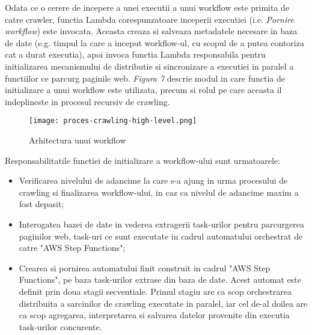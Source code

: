 Odata ce o cerere de incepere a unei executii a unui workflow este primita de catre crawler, functia Lambda corespunzatoare inceperii executiei (i.e. \textit{Pornire workflow}) este invocata. Aceasta creaza si salveaza metadatele necesare in baza de date (e.g. timpul la care a inceput workflow-ul, cu scopul de a putea contoriza cat a durat executia), apoi invoca functia Lambda responsabila pentru initializarea mecanismului de distributie si sincronizare a executiei in paralel a functiilor ce parcurg paginile web. \textit{Figura 7} descrie modul in care functia de initializare a unui workflow este utilizata, precum si rolul pe care aceasta il indeplineste in procesul recursiv de crawling.

\begin{figure}[ht]
\begin{center}
	\texttt{[image: proces-crawling-high-level.png]}
	\caption{Arhitectura unui workflow \cite{diagram-icons-sources, aws-icons-source}}\par\medskip 

\end{center}
\end{figure}

Responsabilitatile functiei de initializare a workflow-ului sunt urmatoarele:

\begin{itemize}
	\item{Verificarea nivelului de adancime la care s-a ajung in urma procesului de crawling si finalizarea workflow-ului, in caz ca nivelul de adancime maxim a fost depasit;}
	\item{Interogatea bazei de date in vederea extragerii task-urilor pentru parcurgerea paginilor web, task-uri ce sunt executate in cadrul automatului orchestrat de catre "AWS Step Functions";}
	\item{Crearea si pornirea automatului finit construit in cadrul "AWS Step Functions", pe baza task-urilor extrase din baza de date. Acest automat este definit prin doua stagii secventiale. Primul stagiu are ca scop orchestrarea distribuita a sarcinilor de crawling executate in paralel, iar cel de-al doilea are ca scop agregarea, interpretarea si salvarea datelor provenite din executia task-urilor concurente.}
\end{itemize}
